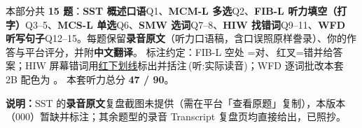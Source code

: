 
\vspace{1mm}
{\small\color{gray} 本部分共 \textbf{15 题}：\textbf{SST 概述口语}Q1、\textbf{MCM-L 多选}Q2、\textbf{FIB-L 听力填空（打字）}Q3--5、\textbf{MCS-L 单选}Q6、\textbf{SMW 选词}Q7--8、\textbf{HIW 找错词}Q9--11、\textbf{WFD 听写句子}Q12--15。每题保留\textbf{录音原文}（听力口语稿，含口误照原样誊录）、你的作答与平台评分，并附\textbf{中文翻译}。
标注约定：FIB-L 空处 =对、{\color{cWrong}}\,红叉=错并给答案；HIW 屏幕错词用{\color{cWrong}\uline{红下划线}}标出并括注\,{\footnotesize\color{cFix}(听:实际读音)}；WFD 逐词批改本套 2B 配色为 \wfdlegend 。
本套听力总分 \textbf{47 / 90}。}
\vspace{1mm}

{\small\color{gray}\textbf{说明：}SST 的\textbf{录音原文}复盘截图未提供（需在平台「查看原题」复制），本版本（000）暂缺并标注；其余题型的录音 Transcript 复盘页均直接给出，已照抄。}
\vspace{2mm}


